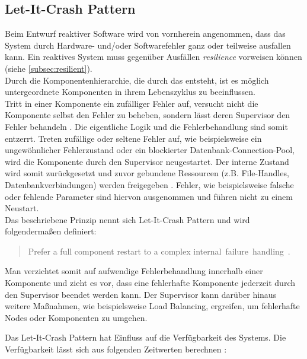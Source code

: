 \pagebreak

\subsection{Let-It-Crash Pattern}\label{subsec:let-it-crash-pattern}
Beim Entwurf reaktiver Software wird von vornherein angenommen, dass das System durch Hardware- und/oder Softwarefehler ganz oder teilweise ausfallen kann. Ein reaktives System muss gegenüber Ausfällen \textit{resilience} vorweisen können (siehe \ref{subsec:resilient}).\\
Durch die Komponentenhierarchie, die durch das  entsteht, ist es möglich untergeordnete Komponenten in ihrem Lebenszyklus zu beeinflussen.\\
Tritt in einer Komponente ein zufälliger Fehler auf, versucht nicht die Komponente selbst den Fehler zu beheben, sondern lässt deren Supervisor den Fehler behandeln \cite[S.~196]{kuhn_reactive_2015} \cite[S.~200~\&~S.~201]{armstrong_programming_2013}. Die eigentliche Logik und die Fehlerbehandlung sind somit entzerrt. Treten zufällige oder seltene Fehler auf, wie beispielsweise ein ungewöhnlicher Fehlerzustand oder ein blockierter Datenbank-Connection-Pool, wird die Komponente durch den Supervisor neugestartet. Der interne Zustand wird somit zurückgesetzt und zuvor gebundene Ressourcen (z.B. File-Handles, Datenbankverbindungen) werden freigegeben \cite[S.~197]{kuhn_reactive_2015}. Fehler, wie beispielsweise falsche oder fehlende Parameter sind hiervon ausgenommen und führen nicht zu einem Neustart.\\
Das beschriebene Prinzip nennt sich Let-It-Crash Pattern und wird folgendermaßen definiert:

\begin{quotation}
Prefer a full component restart to a complex internal~failure~handling~\cite[S.~196]{kuhn_reactive_2015}.
\end{quotation}

Man verzichtet somit auf aufwendige Fehlerbehandlung innerhalb einer Komponente und zieht es vor, dass eine fehlerhafte Komponente jederzeit durch den Supervisor beendet werden kann. Der Supervisor kann darüber hinaus weitere Maßnahmen, wie beispielsweise Load Balancing, ergreifen, um fehlerhafte Nodes oder Komponenten zu umgehen.

\pagebreak

Das Let-It-Crash Pattern hat Einfluss auf die Verfügbarkeit des Systems. Die Verfügbarkeit lässt sich aus folgenden Zeitwerten berechnen \cite{friedrichsen_unkaputtbar_2014}:

